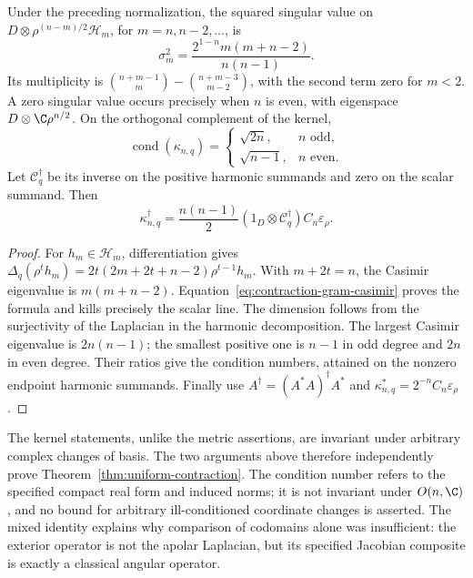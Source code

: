 \begin{theorem}
\label{thm:contraction-singular-values}
Under the preceding normalization, the squared singular value on
\(D\otimes\rho^{(n-m)/2}\mathcal H_m\), for
\(m=n,n-2,\ldots\), is
\begin{equation}\label{eq:contraction-singular-values}
 \sigma_m^2=\frac{2^{1-n}m(m+n-2)}{n(n-1)}.
\end{equation}
Its multiplicity is
\(\binom{n+m-1}{m}-\binom{n+m-3}{m-2}\), with the second
term zero for \(m<2\). A zero singular value occurs precisely
when \(n\) is even, with eigenspace
\(D\otimes\C\rho^{n/2}\). On the orthogonal complement
of the kernel,
\begin{equation}\label{eq:contraction-condition-number}
 \operatorname{cond}(\kappa_{n,q})=
 \begin{cases}\sqrt{2n},&n\text{ odd},\\
 \sqrt{n-1},&n\text{ even}.
 \end{cases}
\end{equation}
Let \(\mathscr C_q^\dagger\) be its inverse on the positive
harmonic summands and zero on the scalar summand. Then
\begin{equation}\label{eq:contraction-pseudoinverse}
 \kappa_{n,q}^{\dagger}
 =\frac{n(n-1)}2(1_D\otimes\mathscr C_q^{\dagger})
 C_n\varepsilon_{\rho}.
\end{equation}
\end{theorem}
\begin{proof}
For \(h_m\in\mathcal H_m\), differentiation gives
\(\Delta_q(\rho^t h_m)=2t(2m+2t+n-2)\rho^{t-1}h_m\).
With \(m+2t=n\), the Casimir eigenvalue is \(m(m+n-2)\).
Equation~\eqref{eq:contraction-gram-casimir} proves the formula and
kills precisely the scalar line. The dimension follows from the
surjectivity of the Laplacian in the harmonic decomposition.
The largest Casimir eigenvalue is \(2n(n-1)\); the smallest
positive one is \(n-1\) in odd degree and \(2n\) in even
degree. Their ratios give the condition numbers, attained on the
nonzero endpoint harmonic summands. Finally use
\(A^\dagger=(A^*A)^\dagger A^*\) and
\(\kappa_{n,q}^*=2^{-n}C_n\varepsilon_{\rho}\).
\end{proof}

The kernel statements, unlike the metric assertions, are invariant
under arbitrary complex changes of basis. The two arguments above
therefore independently prove Theorem~\ref{thm:uniform-contraction}.
The condition number refers to the specified compact real form and
induced norms; it is not invariant under \(O(n,\C)\), and no
bound for arbitrary ill-conditioned coordinate changes is asserted.
The mixed identity explains why comparison of codomains alone was
insufficient: the exterior operator is not the apolar Laplacian, but
its specified Jacobian composite is exactly a classical angular
operator.
